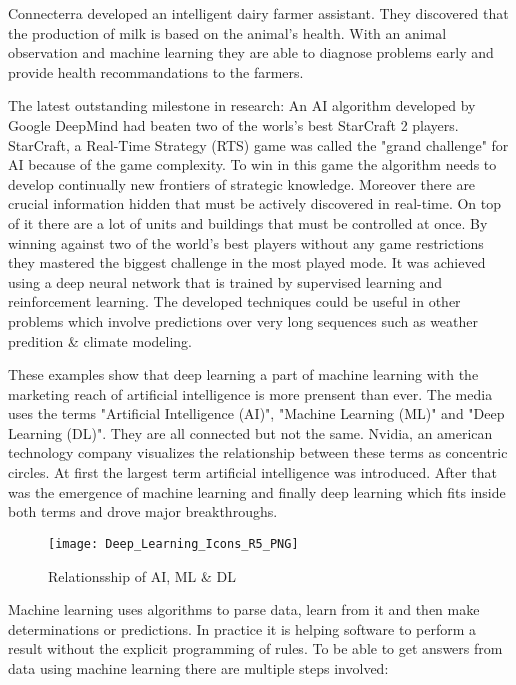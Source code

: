 Connecterra developed an intelligent dairy farmer assistant.
They discovered that the production of milk is based on the animal’s health.
With an animal observation and machine learning they are able to diagnose problems early and provide health recommandations to the farmers.
\cite{tensorflow-stories, connecterra-video, connecterra-web}

The latest outstanding milestone in research: An AI algorithm developed by Google DeepMind had beaten two of the worls's best StarCraft 2 players.
StarCraft, a Real-Time Strategy (RTS) game was called the "grand challenge" for AI because of the game complexity.
To win in this game the algorithm needs to develop continually new frontiers of strategic knowledge.
Moreover there are crucial information hidden that must be actively discovered in real-time. On top of it there are a lot of units and buildings that must be controlled at once.
By winning against two of the world's best players without any game restrictions they mastered the biggest challenge in the most played mode.
It was achieved using a deep neural network that is trained by supervised learning and reinforcement learning.
The developed techniques could be useful in other problems which involve predictions over very long sequences such as weather predition \& climate modeling.
\cite{alphastar}

These examples show that deep learning a part of machine learning with the marketing reach of artificial intelligence is more prensent than ever.
The media uses the terms "Artificial Intelligence (AI)", "Machine Learning (ML)" and "Deep Learning (DL)". They are all connected but not the same.
\hfill \break
Nvidia, an american technology company visualizes the relationship between these terms as concentric circles.
At first the largest term artificial intelligence was introduced.
After that was the emergence of machine learning and finally deep learning which fits inside both terms and drove major breakthroughs.
\cite{nvidia-ai-explained}

\begin{figure}[H]
    \centering
    \texttt{[image: Deep\_Learning\_Icons\_R5\_PNG]}
    \caption{\cite[page 5]{nvidia-ai-explained} Relationsship of AI, ML \& DL}
    \label{fig:ai_ml_dl_termns}
\end{figure}

Machine learning uses algorithms to parse data, learn from it and then make determinations or predictions.
In practice it is helping software to perform a result without the explicit programming of rules.
To be able to get answers from data using machine learning there are multiple steps involved:
\cite{nvidia-ai-explained, tensorflow-about}

